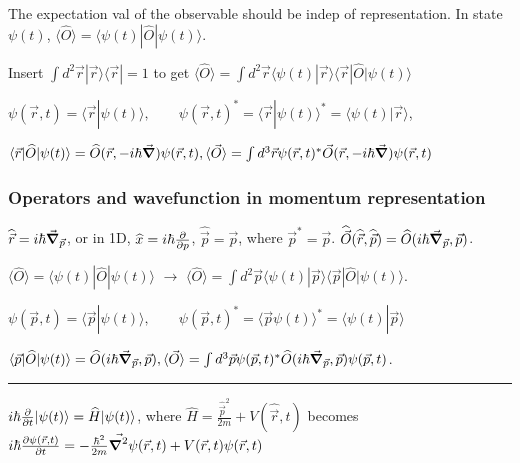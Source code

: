 The expectation val of the observable should be indep of representation. In state $\psi(t)$, $\langle \widehat{O} \rangle = \langle \psi(t) | \widehat{O} | \psi(t) \rangle$.

Insert $\int d^2 \vec{r} | \vec{r} \rangle \langle \vec{r} | = 1$ to get $\langle \widehat{O} \rangle = \int d^2 \vec{r} \langle \psi(t) | \vec{r} \rangle \langle \vec{r} | \widehat{O} | \psi(t) \rangle$

$\psi(\vec{r}, t) = \langle \vec{r} | \psi(t) \rangle, \qquad \psi(\vec{r}, t)^* = \langle \vec{r} | \psi(t) \rangle^* = \langle \psi(t) | \vec{r} \rangle$,

$\langle \vec{r} | \widehat{O} | \psi(t) \rangle = \widehat{O} (\vec{r}, -i \hbar \vec{\grad}) \psi(\vec{r}, t), \langle \vec{O} \rangle = \int d^3 \vec{r} \psi(\vec{r}, t)^* \vec{O}(\vec{r}, -i \hbar \vec{\grad}) \psi(\vec{r}, t)$

\subsubsection{Operators and wavefunction in momentum representation}

$\widehat{\vec{r}} = i \hbar \vec{\grad}_{\vec{p}}$, or in 1D, $\widehat{x} = i \hbar \pdv{}{p}$, $\widehat{\vec{p}} = \vec{p}$, where $\vec{p}^* = \vec{p}$.
$\widehat{\vec{O}} (\widehat{\vec{r}}, \widehat{\vec{p}}) = \widehat{O} (i \hbar \vec{\grad}_{\vec{p}}, \vec{p})$.

$\langle \widehat{O} \rangle = \langle \psi(t) | \widehat{O} | \psi(t) \rangle$ $\rightarrow$ $\langle \widehat{O} \rangle = \int d^2 \vec{p} \langle \psi(t) | \vec{p} \rangle \langle \vec{p} | \widehat{O} | \psi(t) \rangle$.

$\psi(\vec{p}, t) = \langle \vec{p} | \psi(t) \rangle, \qquad \psi(\vec{p}, t)^* = \langle \vec{p} \psi(t) \rangle^* = \langle \psi(t) | \vec{p} \rangle$

$\langle \vec{p} | \widehat{O} | \psi(t) \rangle = \widehat{O} (i \hbar \vec{\grad}_{\vec{p}}, \vec{p}), \langle \vec{O} \rangle = \int d^3 \vec{p} \psi(\vec{p}, t)^* \widehat{O}(i \hbar \vec{\grad}_{\vec{p}}, \vec{p}) \psi(\vec{p}, t)$.

\smallskip \hrule height 0.3pt

$i \hbar \pdv{}{t} | \psi(t) \rangle = \widehat{H} | \psi(t) \rangle$, where $\widehat{H} = \frac{\widehat{\vec{p}}^2}{2m} + V(\widehat{\vec{r}}, t)$ becomes $i \hbar \pdv{\psi(\vec{r}, t)}{t} = - \frac{\hbar^2}{2m} \vec{\grad^2} \psi(\vec{r}, t) + V(\vec{r}, t) \psi(\vec{r}, t)$

